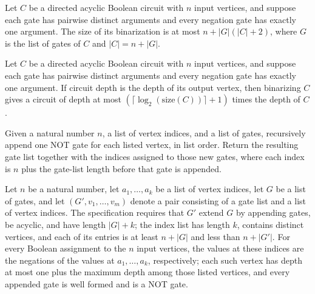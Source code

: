 \begin{theorem}
\label{BoolCircuit.DAGCircuit.binarize_size_le}
\leanok
{}
Let $C$ be a directed acyclic Boolean circuit with $n$ input vertices, and suppose each
gate has pairwise distinct arguments and every negation gate has exactly one argument.
The size of its binarization is at most $n+|G|(|C|+2)$, where $G$ is the list of gates
of $C$ and $|C|=n+|G|$.
\end{theorem}

\begin{theorem}
\label{BoolCircuit.DAGCircuit.binarize_depth_le}
\leanok
{}
Let $C$ be a directed acyclic Boolean circuit with $n$ input vertices, and suppose each
gate has pairwise distinct arguments and every negation gate has exactly one argument.
If circuit depth is the depth of its output vertex, then binarizing $C$ gives a circuit
of depth at most $(\lceil\log_2(\mathrm{size}(C))\rceil+1)$ times the depth of $C$.
\end{theorem}

\begin{definition}
\label{BoolCircuit.emitNots}
\leanok
{}
Given a natural number $n$, a list of vertex indices, and a list of gates, recursively
append one NOT gate for each listed vertex, in list order. Return the resulting gate
list together with the indices assigned to those new gates, where each index is $n$ plus
the gate-list length before that gate is appended.
\end{definition}

\begin{definition}
\label{BoolCircuit.NotsSpec}
\leanok
{}
Let $n$ be a natural number, let $a_1,\ldots,a_k$ be a list of vertex indices, let $G$
be a list of gates, and let $(G',v_1,\ldots,v_m)$ denote a pair consisting of a gate
list and a list of vertex indices. The specification requires that $G'$ extend $G$ by
appending gates, be acyclic, and have length $|G|+k$; the index list has length $k$,
contains distinct vertices, and each of its entries is at least $n+|G|$ and less than
$n+|G'|$. For every Boolean assignment to the $n$ input vertices, the values at these
indices are the negations of the values at $a_1,\ldots,a_k$, respectively; each such
vertex has depth at most one plus the maximum depth among those listed vertices, and
every appended gate is well formed and is a NOT gate.
\end{definition}

